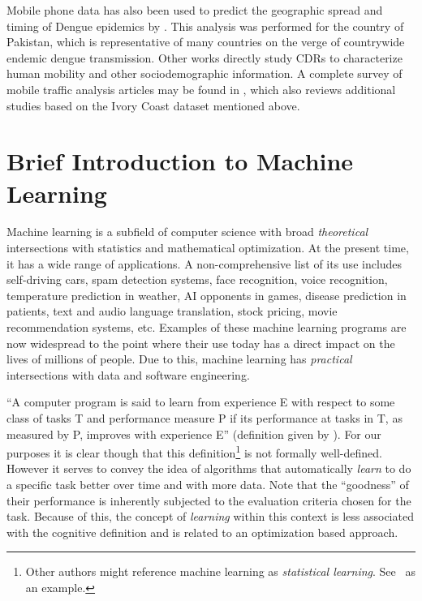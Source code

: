 Mobile phone data has also been used to predict the geographic spread and timing of Dengue epidemics by \cite{wesolowski2015impact}. This analysis was performed for the country of Pakistan, which is representative of many countries on the verge of countrywide endemic dengue transmission. Other works directly study CDRs to characterize human mobility and other sociodemographic information. A complete survey of mobile traffic analysis articles may be found in \cite{naboulsi2015mobile}, which also reviews additional studies based on the Ivory Coast dataset mentioned above.



\section{Brief Introduction to Machine Learning}

Machine learning is a subfield of computer science with broad \textit{theoretical} intersections with statistics and mathematical optimization. At the present time, it has a wide range of applications. A non-comprehensive list of its use includes self-driving cars, spam detection systems, face recognition, voice recognition, temperature prediction in weather, AI opponents in games, disease prediction in patients, text and audio language translation, stock pricing, movie recommendation systems, etc. Examples of these machine learning programs are now widespread to the point where their use today has a direct impact on the lives of millions of people. Due to this, machine learning has \textit{practical} intersections with data and software engineering.

``A computer program is said to learn from experience E with respect to some class of tasks T and performance measure P if its performance at tasks in T, as measured by P, improves with experience E'' (definition given by \cite{Mitchell-MLearning}). For our purposes it is clear though that this definition\footnote{Other authors might reference machine learning as \textit{statistical learning}. See~\cite{hastie-elemstatslearn} as an example.} is not formally well-defined. However it serves to convey the idea of algorithms that automatically \textit{learn} to do a specific task better over time and with more data. Note that the ``goodness'' of their performance is inherently subjected to the evaluation criteria chosen for the task. Because of this, the concept of \textit{learning} within this context is less associated with the cognitive definition and is related to an optimization based approach.

